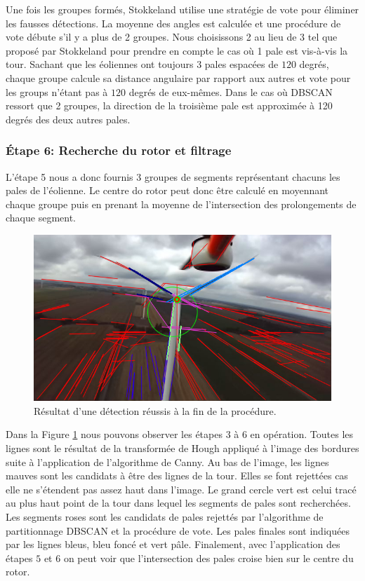 Une fois les groupes formés, Stokkeland utilise une stratégie de vote pour éliminer les fausses détections. La moyenne des angles est calculée et une procédure de vote débute s'il y a plus de 2 groupes. Nous choisissons 2 au lieu de 3 tel que proposé par Stokkeland pour prendre en compte le cas où 1 pale est vis-à-vis la tour. Sachant que les éoliennes ont toujours 3 pales espacées de $120$ degrés, chaque groupe calcule sa distance angulaire par rapport aux autres et vote pour les groups n'étant pas à $120$ degrés de eux-mêmes. Dans le cas où DBSCAN ressort que 2 groupes, la direction de la troisième pale est approximée à 120 degrés des deux autres pales.

\subsubsection{Étape 6: Recherche du rotor et filtrage}

L'étape 5 nous a donc fournis 3 groupes de segments représentant chacuns les pales de l'éolienne. Le centre do rotor peut donc être calculé en moyennant chaque groupe puis en prenant la moyenne de l'intersection des prolongements de chaque segment.

\begin{figure}[htb]
  \centering
  \includegraphics[width=0.8\linewidth]{images/turbine_detect_result.png}
  \caption{Résultat d'une détection réussis à la fin de la procédure.}
  \label{fig:detect_result_step6}
\end{figure}

Dans la Figure \ref{fig:detect_result_step6} nous pouvons observer les étapes $3$ à $6$ en opération. Toutes les lignes sont le résultat de la transformée de Hough appliqué à l'image des bordures suite à l'application de l'algorithme de Canny. Au bas de l'image, les lignes mauves sont les candidats à être des lignes de la tour. Elles se font rejettées cas elle ne s'étendent pas assez haut dans l'image. Le grand cercle vert est celui tracé au plus haut point de la tour dans lequel les segments de pales sont recherchées. Les segments roses sont les candidats de pales rejettés par l'algorithme de partitionnage DBSCAN et la procédure de vote.
Les pales finales sont indiquées par les lignes bleus, bleu foncé et vert pâle. Finalement, avec l'application des étapes $5$ et $6$ on peut voir que l'intersection des pales croise bien sur le centre du rotor.

